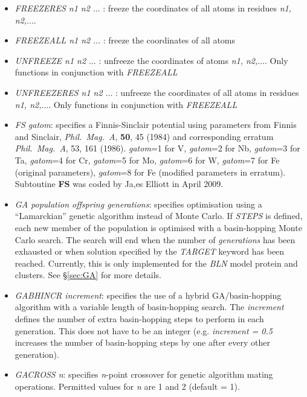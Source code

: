 \documentclass[12pt,a4paper,dvips]{article}
\begin{document}
\begin{itemize}
\item {\it FREEZERES n1 n2 $\ldots$ \/}: freeze the coordinates of all atoms in residues {\it n1, n2,$\ldots$}.

\item {\it FREEZEALL n1 n2 $\ldots$ \/}: freeze the coordinates of all atoms 

\item {\it UNFREEZE n1 n2 $\ldots$ \/}: unfreeze the coordinates of atoms {\it n1, n2,$\ldots$}. Only functions in conjunction with 
{\it FREEZEALL\/}

\item {\it UNFREEZERES n1 n2 $\ldots$ \/}: unfreeze the coordinates of all atoms in residues {\it n1, n2,$\ldots$}. Only functions in conjunction with 
{\it FREEZEALL\/}

\item{\it FS gatom}: specifies a Finnis-Sinclair potential using parameters from 
Finnis and Sinclair, {\it Phil.~Mag.~A}, {\bf 50}, 45 (1984) 
and corresponding erratum {\it Phil.~Mag.~A}, 53, 161 (1986). 
{\it gatom}=1 for V, {\it gatom}=2 for Nb, {\it gatom}=3 for Ta, {\it gatom}=4 
for Cr, {\it gatom}=5 for Mo, {\it gatom}=6 for W, {\it gatom}=7 
for Fe (original parameters), {\it gatom}=8 for Fe (modified parameters in erratum). 
Subtoutine {\bf FS} was coded by Ja,es Elliott in April 2009.

\item {\it GA population offspring generations}: specifies optimisation using a
``Lamarckian'' genetic algorithm\cite{Johnston03} instead of Monte Carlo. If
{\it STEPS} is defined, each new member of the population is optimised with a
basin-hopping Monte Carlo search. The search will end when the number
of {\it generations} has been exhausted or when solution specified by
the {\it TARGET} keyword has been reached. Currently, this is only implemented
for the {\it BLN\/} model protein and clusters. See \S \ref{sec:GA} for more
details.

\item {\it GABHINCR increment\/}: specifies the use of a hybrid
GA/basin-hopping algorithm with a variable length of basin-hopping search. The
{\it increment} defines the number of extra basin-hopping steps to perform in
each generation. This does not have to be an integer (e.g. {\it increment =
0.5} increases the number of basin-hopping steps by one after every other
generation).

\item {\it GACROSS n}: specifies {\it n}-point crossover for genetic algorithm
mating operations. Permitted values for {\it n} are 1 and 2 (default = 1).


\end{itemize}
\end{document}
